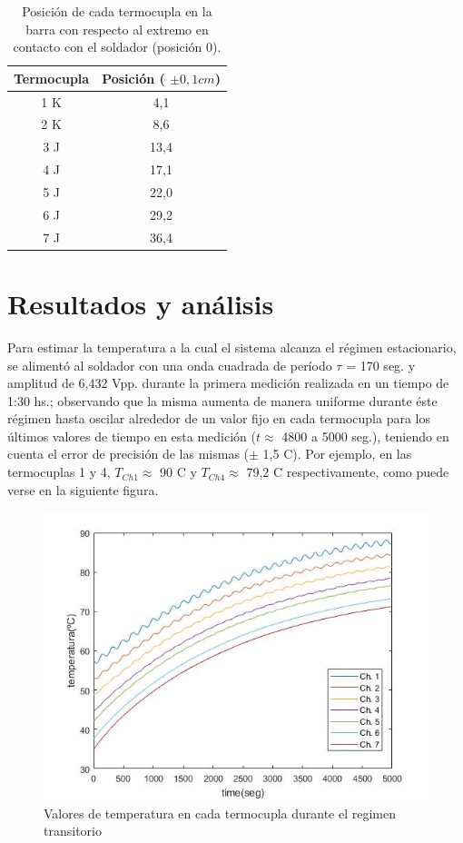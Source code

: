 \documentclass[twoside,twocolumn,a4paper]{article}
\begin{document}
\begin{table}[H]
\centering
\caption{Posici\'on de cada termocupla en la barra con respecto al extremo en contacto con el soldador (posici\'on 0).}
\label{tab:posiciones}
\begin{tabular}{|c|c|}
\hline
Termocupla & Posici\'on ( $\pm 0,1 cm$) \\ \hline
1 K & 4,1\\ \hline
2 K & 8,6\\ \hline
3 J & 13,4\\ \hline
4 J & 17,1\\ \hline
5 J & 22,0\\ \hline
6 J & 29,2\\ \hline
7 J & 36,4\\ \hline
\end{tabular}
\end{table}

\section{Resultados y an\'alisis}

Para estimar la temperatura a la cual el sistema alcanza el r\'egimen estacionario, se aliment\'o al soldador con una onda cuadrada de per\'iodo $\tau$ = 170 seg. y amplitud de 6,432 Vpp. durante la primera medici\'on realizada en un tiempo de 1:30 hs.; observando que la misma aumenta de manera uniforme durante \'este r\'egimen hasta oscilar alrededor de un valor fijo en cada termocupla para los \'ultimos valores de tiempo en esta medici\'on ($t \approx$ 4800 a 5000 seg.), teniendo en cuenta el error de precisi\'on de las mismas ($\pm$ 1,5 \degree C). Por ejemplo, en las termocuplas 1 y 4, $T_{Ch 1} \approx$  90 \degree C y $T_{Ch 4} \approx$ 79,2 \degree C respectivamente, como puede verse en la siguiente figura.

\begin{figure}[H]
\includegraphics[width=\linewidth]{Tvst_transitorio.jpg}
\caption{Valores de temperatura en cada termocupla durante el regimen transitorio}
\label{fig:Tvst_transitorio}
\end{figure}
\end{document}
